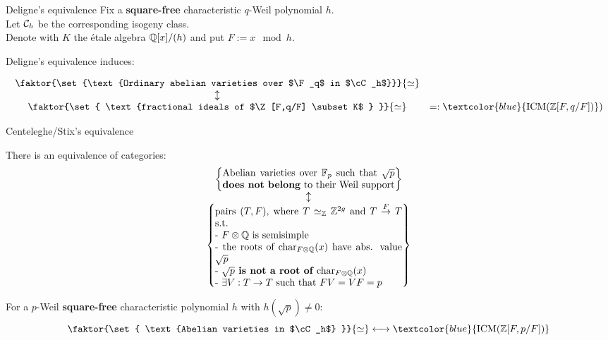 \documentclass[handout]{beamer}
\begin{document}
\begin{frame}{ Deligne's equivalence }
Fix a \textbf{square-free} characteristic $q$-Weil polynomial $h$.\\
Let ${\mathcal C}_h$ be the corresponding isogeny class.\\
Denote with $K$ the \'etale algebra $\mathbb{Q}[x]/(h)$ and put $F:= x \mod h$.

\pause Deligne's equivalence induces:

\[\begin{array}{cc}
\faktor{\set{\text{Ordinary abelian varieties over $\F_q$ in $\cC_h$}}}{\simeq} & \\
\updownarrow & \\
\faktor{\set{ \text{fractional ideals of $\Z[F,q/F] \subset K$ } }}{\simeq} & =:\textcolor{blue}{\ICM(\Z[F,q/F])}) 
\end{array}\]
\end{frame}

\begin{frame}{ Centeleghe/Stix's equivalence }
\begin{theorem}
There is an equivalence of categories:
\[\begin{array}{c}
\set{\parbox{17.5em}{Abelian varieties over $\F_p$ such that $\sqrt{p}$ \textbf{does not belong} to their Weil support}}\\
\updownarrow\\
\set{\parbox[p]{19em}{pairs $(T,F)$, where $T\simeq_\Z \Z^{2g}$ and $T\overset{F}{\to} T$ s.t.\\
- $F\otimes \Q$ is semisimple\\
- the roots of $\Char_{F\otimes\Q}(x)$ have abs. value $\sqrt{p}$\\
- \textbf{$\sqrt{p}$ is not a root of $\Char_{F\otimes\Q}(x)$}\\
- $\exists V:T\to T$ such that $FV=VF=p$
}}
\end{array}\]
\end{theorem}

\pause For a $p$-Weil \textbf{square-free} characteristic polynomial $h$ with $h(\sqrt{p})\neq 0$:
\[\faktor{\set{ \text{Abelian varieties in $\cC_h$} }}{\simeq} \longleftrightarrow \textcolor{blue}{\ICM(\Z[F,p/F])}  \]

\end{frame}
\end{document}
